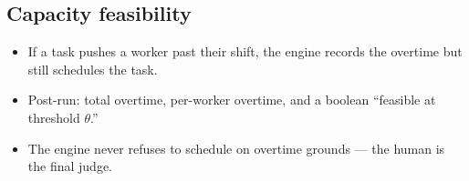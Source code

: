 \subsection{Capacity feasibility}

\begin{itemize}
  \item If a task pushes a worker past their shift, the engine
        records the overtime but still schedules the task.
  \item Post-run: total overtime, per-worker overtime, and a
        boolean ``feasible at threshold $\theta$.''
  \item The engine never refuses to schedule on overtime grounds
        --- the human is the final judge.
\end{itemize}
